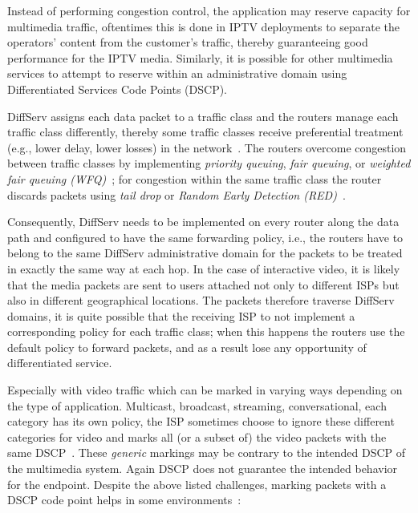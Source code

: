 Instead of performing congestion control, the application may reserve capacity
for multimedia traffic, oftentimes this is done in IPTV deployments to
separate the operators' content from the customer's traffic, thereby
guaranteeing good performance for the IPTV media. Similarly, it is possible
for other multimedia services to attempt to reserve within an administrative
domain using Differentiated Services Code Points (DSCP). 

DiffServ assigns each data packet to a traffic class and the routers manage
each traffic class differently, thereby some traffic classes receive
preferential treatment (e.g., lower delay, lower losses) in the
network~\cite{rfc2475}. The routers overcome congestion between traffic
classes by implementing \emph{priority queuing}, \emph{fair queuing}, or
\emph{weighted fair queuing (WFQ)}~\cite{rfc4594}; for congestion within the
same traffic class the router discards packets using \emph{tail drop} or
\emph{Random Early Detection (RED)}~\cite{Floyd:RED}.


Consequently, DiffServ needs to be implemented on every router along the data
path and configured to have the same forwarding policy, i.e., the routers have
to belong to the same DiffServ administrative domain for the packets to be
treated in exactly the same way at each hop. In the case of interactive video,
it is likely that the media packets are sent to users attached not only to
different ISPs but also in different geographical locations. The packets
therefore traverse DiffServ domains, it is quite possible that the receiving
ISP to not implement a corresponding policy for each  traffic class; when this
happens the routers use the default policy to forward packets, and as a result
lose any opportunity of differentiated service.


Especially with video traffic which can be marked in varying ways depending on
the type of application. Multicast, broadcast, streaming, conversational, each
category has its own policy, the ISP sometimes choose to ignore these
different categories for video and marks all (or a subset of) the video
packets with the same DSCP~\cite{rfc5865}. These \emph{generic} markings may
be contrary to the intended DSCP of the multimedia system. Again DSCP does not
guarantee the intended behavior for the endpoint. Despite the above listed
challenges, marking packets with a DSCP code point helps in some
environments~\cite{draft.rtcweb.qos}:


